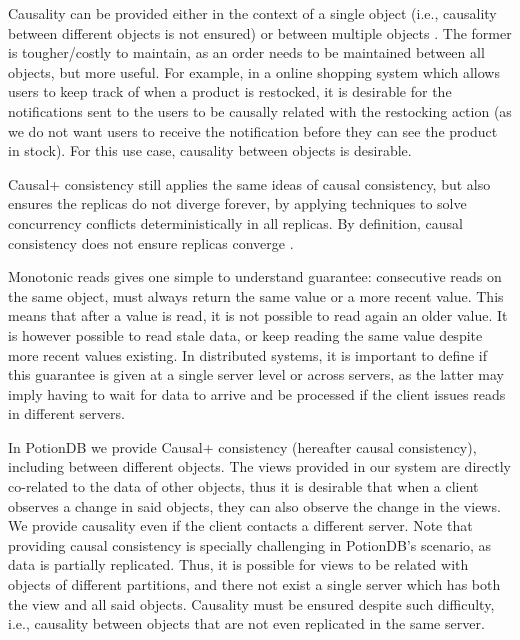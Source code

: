 
Causality can be provided either in the context of a single object (i.e., causality between different objects is not ensured) or between multiple objects \cite{understandingEC}.
The former is tougher/costly to maintain, as an order needs to be maintained between all objects, but more useful.
For example, in a online shopping system which allows users to keep track of when a product is restocked, it is desirable for the notifications sent to the users to be causally related with the restocking action (as we do not want users to receive the notification before they can see the product in stock).
For this use case, causality between objects is desirable.

Causal+ consistency \cite{cops} still applies the same ideas of causal consistency, but also ensures the replicas do not diverge forever, by applying techniques to solve concurrency conflicts deterministically in all replicas.
By definition, causal consistency does not ensure replicas converge \cite{cops}.

Monotonic reads \cite{session, understandingEC} gives one simple to understand guarantee: consecutive reads on the same object, must always return the same value or a more recent value.
This means that after a value is read, it is not possible to read again an older value.
It is however possible to read stale data, or keep reading the same value despite more recent values existing.
In distributed systems, it is important to define if this guarantee is given at a single server level or across servers, as the latter may imply having to wait for data to arrive and be processed if the client issues reads in different servers.

In PotionDB we provide Causal+ consistency (hereafter causal consistency), including between different objects.
The views provided in our system are directly co-related to the data of other objects, thus it is desirable that when a client observes a change in said objects, they can also observe the change in the views.
We provide causality even if the client contacts a different server.
Note that providing causal consistency is specially challenging in PotionDB's scenario, as data is partially replicated.
Thus, it is possible for views to be related with objects of different partitions, and there not exist a single server which has both the view and all said objects.
Causality must be ensured despite such difficulty, i.e., causality between objects that are not even replicated in the same server.

